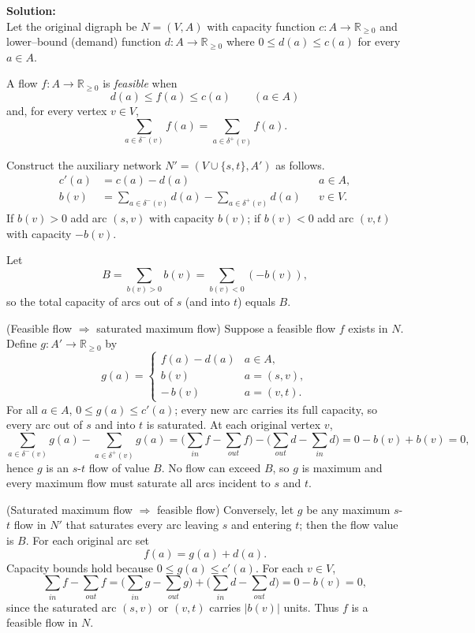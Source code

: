 \documentclass{article}
\begin{document}
\begin{enumerate}
    \textbf{Solution:} \\
Let the original digraph be \(N=(V,A)\) with capacity function \(c:A\to\mathbb R_{\ge0}\) and lower–bound (demand) function \(d:A\to\mathbb R_{\ge0}\) where \(0\le d(a)\le c(a)\) for every \(a\in A\).

A flow \(f:A\to\mathbb R_{\ge0}\) is \textit{feasible} when
\[
d(a)\le f(a)\le c(a)\qquad(a\in A)
\]
and, for every vertex \(v\in V\),
\[
\sum_{a\in\delta^{-}(v)}f(a)=\sum_{a\in\delta^{+}(v)}f(a).
\]

Construct the auxiliary network \(N'=(V\cup\{s,t\},A')\) as follows.
\begin{align*}
c'(a) &= c(a)-d(a)                          && a\in A,\\
b(v)  &= \sum_{a\in\delta^{-}(v)}d(a)-\sum_{a\in\delta^{+}(v)}d(a) && v\in V.
\end{align*}
If \(b(v)>0\) add arc \((s,v)\) with capacity \(b(v)\);  
if \(b(v)<0\) add arc \((v,t)\) with capacity \(-b(v)\).

Let  
\[
B=\sum_{b(v)>0}b(v)=\sum_{b(v)<0}(-b(v)),
\]
so the total capacity of arcs out of \(s\) (and into \(t\)) equals \(B\).

(Feasible flow \(\Rightarrow\) saturated maximum flow)  
Suppose a feasible flow \(f\) exists in \(N\).  Define \(g:A'\to\mathbb R_{\ge0}\) by
\[
g(a)=
\begin{cases}
f(a)-d(a) & a\in A,\\
b(v)      & a=(s,v),\\
-\,b(v)   & a=(v,t).
\end{cases}
\]
For all \(a\in A\), \(0\le g(a)\le c'(a)\); every new arc carries its full capacity, so every arc out of \(s\) and into \(t\) is saturated.  At each original vertex \(v\),
\[
\sum_{a\in\delta^{-}(v)}g(a)-\sum_{a\in\delta^{+}(v)}g(a)
=\bigl(\sum_{in}f-\sum_{out}f\bigr)-\bigl(\sum_{out}d-\sum_{in}d\bigr)
=0-b(v)+b(v)=0,
\]
hence \(g\) is an \(s\)-\(t\) flow of value \(B\).  No flow can exceed \(B\), so \(g\) is maximum and every maximum flow must saturate all arcs incident to \(s\) and \(t\).

(Saturated maximum flow \(\Rightarrow\) feasible flow)  
Conversely, let \(g\) be any maximum \(s\)-\(t\) flow in \(N'\) that saturates every arc leaving \(s\) and entering \(t\); then the flow value is \(B\).  For each original arc set
\[
f(a)=g(a)+d(a).
\]
Capacity bounds hold because \(0\le g(a)\le c'(a)\).  For each \(v\in V\),
\[
\sum_{in}f-\sum_{out}f
=\bigl(\sum_{in}g-\sum_{out}g\bigr)+\bigl(\sum_{in}d-\sum_{out}d\bigr)
=0-b(v)=0,
\]
since the saturated arc \((s,v)\) or \((v,t)\) carries \(|b(v)|\) units.  Thus \(f\) is a feasible flow in \(N\).


\end{enumerate}
\end{document}
